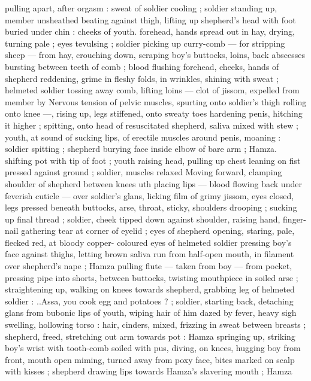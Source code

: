 pulling apart, after orgasm : sweat of soldier cooling ; soldier 
standing up, member unsheathed beating against thigh, lifting up 
shepherd's head with foot buried under chin : cheeks of youth. 
forehead, hands spread out in hay, drying, turning pale ; eyes 
tevulsing ; soldier picking up curry-comb --- for stripping sheep --- 
from hay, crouching down, scraping boy's buttocks, loins, back 
abscesses bursting between teeth of comb ; blood flushing 
forehead, cheeks, hands of shepherd reddening, grime in fleshy 
folds, in wrinkles, shining with sweat ; helmeted soldier tossing away 
comb, lifting loins --- clot of jissom, expelled from member by 
Nervous tension of pelvic muscles, spurting onto soldier's thigh 
rolling onto knee ---, rising up, legs stiffened, onto sweaty toes 
hardening penis, hitching it higher ; spitting, onto head of 
resuscitated shepherd, saliva mixed with stew ; youth, at sound of 
sucking lips, of erectile muscles around penis, moaning : soldier 
spitting ; shepherd burying face inside elbow of bare arm ; Hamza. 
shifting pot with tip of foot ; youth raising head, pulling up chest 
leaning on fist pressed against ground ; soldier, muscles relaxed 
Moving forward, clamping shoulder of shepherd between knees 
uth placing lips --- blood flowing back under feverish cuticle --- 
over soldier's glans, licking film of grimy jissom, eyes closed, legs 
pressed beneath buttocks, arse, throat, sticky, shoulders drooping ; 
sucking up final thread ; soldier, cheek tipped down against shoulder, 
raising hand, finger-nail gathering tear at corner of eyelid ; eyes of 
shepherd opening, staring, pale, flecked red, at bloody copper- 
coloured eyes of helmeted soldier pressing boy's face against 
thighs, letting brown saliva run from half-open mouth, in filament 
over shepherd's nape ; Hamza pulling flute --- taken from boy --- 
from pocket, pressing pipe into shorts, between buttocks, twisting 
mouthpiece in soiled arse ; straightening up, walking on knees 
towards shepherd, grabbing leg of helmeted soldier : {\gl}..Assa, you 
cook egg and potatoes ? {\gr} ; soldier, starting back, detaching glans 
from bubonic lips of youth, wiping hair of him dazed by fever, heavy 
sigh swelling, hollowing torso : hair, cinders, mixed, frizzing in sweat 
between breasts ; shepherd, freed, stretching out arm towards pot : 
Hamza springing up, striking boy's wrist with tooth-comb soiled with 
pus, diving, on knees, hugging boy from front, mouth open miming, 
turned away from poxy face, bites marked on scalp with kisses ; 
shepherd drawing lips towards Hamza's slavering mouth ; Hamza 
